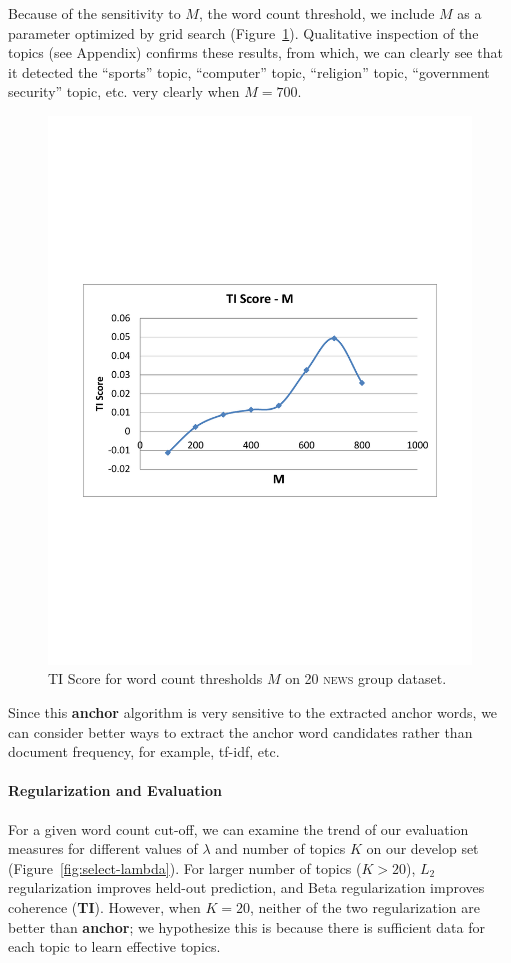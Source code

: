 \documentclass{article}
\begin{document}
Because of the sensitivity to $M$, the word count threshold, we include $M$ as a
parameter optimized by grid search (Figure~\ref{fig:anchor-select}).
Qualitative inspection of the topics (see Appendix) confirms these results,
from which, we can clearly see that it detected the ``sports'' topic, ``computer''
topic, ``religion'' topic, ``government security'' topic, etc. very clearly when
$M = 700$.

\begin{figure}
\centering
\includegraphics[width=0.5\linewidth]{figures/20news_M_TI_chart.pdf}
\caption{TI Score for word count thresholds $M$ on \textsc{20 news} group dataset.}
\label{fig:anchor-select}
\end{figure}











  

Since this {\bf anchor }algorithm is very sensitive to the extracted anchor words,
we can consider better ways to extract the anchor word candidates
rather than document frequency, for example, tf-idf, etc.




\paragraph{Regularization and Evaluation}

For a given word count cut-off, we can examine the trend of our evaluation
measures for different values of $\lambda$ and number of topics $K$ on our
develop set (Figure~\ref{fig:select-lambda}).  
For larger number of topics ($K > 20$), $L_2$ regularization improves held-out prediction,
and Beta regularization improves coherence ({\bf TI}).
However, when $K=20$, neither of the two regularization are better than {\bf
  anchor}; we hypothesize this is because there is sufficient data for each
topic to learn effective topics.
\end{document}
